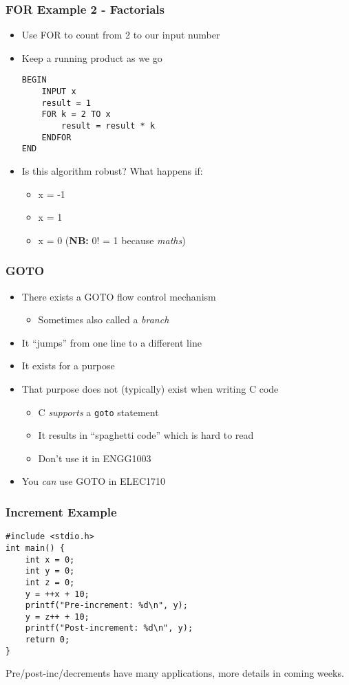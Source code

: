 \documentclass[14pt]{beamer}
\begin{document}
\begin{frame}[fragile]
\frametitle{FOR Example 2 - Factorials}
\begin{itemize}
\item Use FOR to count from 2 to our input number
\item Keep a running product as we go
\begin{lstlisting}[style=pseudo]
BEGIN
	INPUT x
	result = 1
	FOR k = 2 TO x
		result = result * k
	ENDFOR
END
\end{lstlisting}
\item Is this algorithm robust? What happens if:
	\begin{itemize}
		\item x = -1
		\item x = 1
		\item x = 0 (\textbf{NB:} 0! = 1 because \textit{maths})
	\end{itemize}
\end{itemize}
\end{frame}

\begin{frame}
\frametitle{GOTO}
\begin{itemize}
\item There exists a GOTO flow control mechanism
	\begin{itemize}
		\item Sometimes also called a \textit{branch}
	\end{itemize}
\item It ``jumps'' from one line to a different line
\item It exists for a purpose
\item That purpose does not (typically) exist when writing C code
	\begin{itemize}
		\item C \textit{supports} a \texttt{goto} statement
		\item It results in ``spaghetti code'' which is hard to read
		\item Don't use it in ENGG1003
	\end{itemize}
\item You \textit{can} use GOTO in ELEC1710
\end{itemize}
\end{frame}

\begin{frame}[fragile]
\frametitle{Increment Example}
\begin{lstlisting}[style=CStyle,caption=\texttt{increment.c}]
#include <stdio.h>
int main() {
	int x = 0;
	int y = 0;
	int z = 0;
	y = ++x + 10;
	printf("Pre-increment: %d\n", y);
	y = z++ + 10;
	printf("Post-increment: %d\n", y);
	return 0;
}
\end{lstlisting}
Pre/post-inc/decrements have many applications, more details in coming weeks.
\end{frame}
\end{document}
